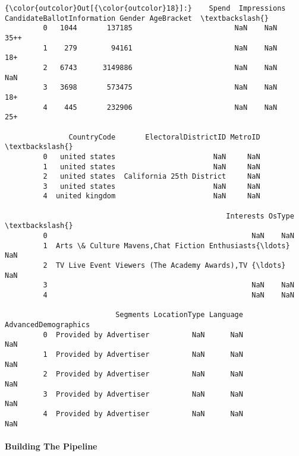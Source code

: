 \documentclass[11pt]{article}
\begin{document}
\begin{Verbatim}[commandchars=\\\{\}]
{\color{outcolor}Out[{\color{outcolor}18}]:}    Spend  Impressions CandidateBallotInformation Gender AgeBracket  \textbackslash{}
         0   1044       137185                        NaN    NaN       35++   
         1    279        94161                        NaN    NaN        18+   
         2   6743      3149886                        NaN    NaN        NaN   
         3   3698       573475                        NaN    NaN        18+   
         4    445       232906                        NaN    NaN        25+   
         
               CountryCode       ElectoralDistrictID MetroID  \textbackslash{}
         0   united states                       NaN     NaN   
         1   united states                       NaN     NaN   
         2   united states  California 25th District     NaN   
         3   united states                       NaN     NaN   
         4  united kingdom                       NaN     NaN   
         
                                                    Interests OsType  \textbackslash{}
         0                                                NaN    NaN   
         1  Arts \& Culture Mavens,Chat Fiction Enthusiasts{\ldots}    NaN   
         2  TV Live Event Viewers (The Academy Awards),TV {\ldots}    NaN   
         3                                                NaN    NaN   
         4                                                NaN    NaN   
         
                          Segments LocationType Language AdvancedDemographics  
         0  Provided by Advertiser          NaN      NaN                  NaN  
         1  Provided by Advertiser          NaN      NaN                  NaN  
         2  Provided by Advertiser          NaN      NaN                  NaN  
         3  Provided by Advertiser          NaN      NaN                  NaN  
         4  Provided by Advertiser          NaN      NaN                  NaN  
\end{Verbatim}
            
    \hypertarget{building-the-pipeline}{%
\paragraph{Building The Pipeline}\label{building-the-pipeline}}
\end{document}
